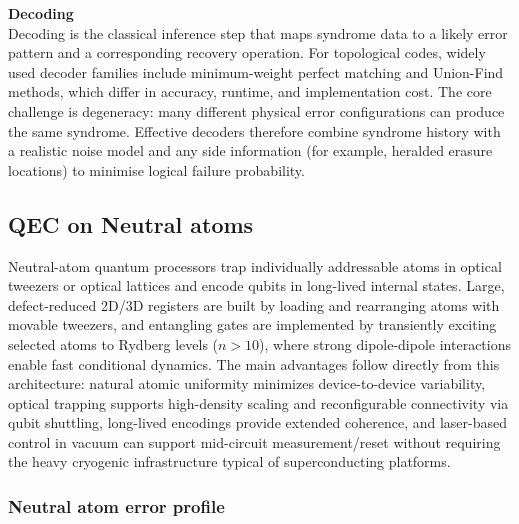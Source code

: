 \documentclass{article}
\begin{document}
    \textbf{Decoding}\\
    Decoding is the classical inference step that maps syndrome data to a likely error pattern and a corresponding recovery operation.
    For topological codes, widely used decoder families include minimum-weight perfect matching and Union-Find methods, which differ in accuracy, runtime, and implementation cost.
    The core challenge is degeneracy: many different physical error configurations can produce the same syndrome. Effective decoders therefore combine syndrome history with a realistic noise model and any side information (for example, heralded erasure locations) to minimise logical failure probability.\\

    \subsection{QEC on Neutral atoms} %
    Neutral-atom quantum processors trap individually addressable atoms in optical tweezers or optical lattices and encode qubits in long-lived internal states. 
    Large, defect-reduced 2D/3D registers are built by loading and rearranging atoms with movable tweezers, and entangling gates are implemented by transiently exciting selected atoms to Rydberg levels ($n > 10$), where strong dipole-dipole interactions enable fast conditional dynamics. 
    The main advantages follow directly from this architecture: natural atomic uniformity minimizes device-to-device variability, optical trapping supports high-density scaling and reconfigurable connectivity via qubit shuttling, long-lived encodings provide extended coherence, and laser-based control in vacuum can support mid-circuit measurement/reset without requiring the heavy cryogenic infrastructure typical of superconducting platforms.\\

    \subsubsection{Neutral atom error profile} \label{subsec:neutral-atom-error-profile}
\end{document}
